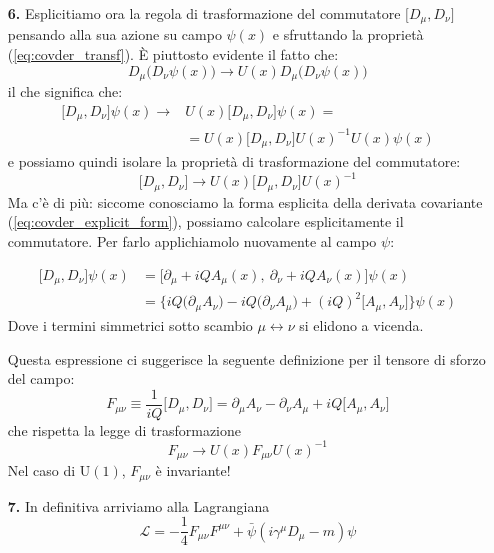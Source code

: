 \documentclass[../main.tex]{subfiles}
\begin{document}
\begin{enumerate}
    \item[\textbf{6.}] Esplicitiamo ora la regola di trasformazione del commutatore $\big[D_\mu,D_\nu\big]$ pensando alla sua azione su campo $\psi(x)$ e sfruttando la proprietà (\ref{eq:covder_transf}). È piuttosto evidente il fatto che:
    \[
    D_\mu\big(D_\nu\psi(x)\big) \rightarrow U(x)D_\mu\big(D_\nu\psi(x)\big)
    \]
    il che significa che:
    \begin{align*}
        \big[D_\mu,D_\nu\big]\psi(x) \rightarrow &U(x)\big[D_\mu,D_\nu\big]\psi(x) = \\
        &= U(x)\big[D_\mu,D_\nu\big]U(x)^{-1}U(x)\psi(x)
    \end{align*}
    e possiamo quindi isolare la proprietà di trasformazione del commutatore:
    \begin{equation}
        \boxed{\big[D_\mu,D_\nu\big] \rightarrow U(x)\big[D_\mu,D_\nu\big]U(x)^{-1}}
        \label{eq:covder_commutator_transf}
    \end{equation}
    Ma c'è di più: siccome conosciamo la forma esplicita della derivata covariante (\ref{eq:covder_explicit_form}), possiamo calcolare esplicitamente il commutatore. Per farlo applichiamolo nuovamente al campo $\psi$:

    \begin{align*}
        \big[D_\mu,D_\nu\big]\psi(x) &= \big[\partial_\mu + iQA_\mu(x), ~\partial_\nu + iQA_\nu(x)\big]\psi(x) \\
        &=\Big\{ iQ\big(\partial_\mu A_\nu\big) -iQ\big(\partial_\nu A_\mu\big) + (iQ)^2\big[A_\mu, A_\nu\big] \Big\}\psi(x)
    \end{align*}
    Dove i termini simmetrici sotto scambio $\mu\leftrightarrow\nu$ si elidono a vicenda.

    Questa espressione ci suggerisce la seguente definizione per il tensore di sforzo del campo:
    \begin{equation}
        \boxed{F_{\mu\nu}\equiv \frac{1}{iQ}\big[D_\mu,D_\nu\big] = \partial_\mu A_\nu - \partial_\nu A_\mu + iQ\big[A_\mu, A_\nu\big]}
        \label{eq:field_strenght_tensor}
    \end{equation}
    che rispetta la legge di trasformazione
    \begin{equation}
        \boxed{F_{\mu\nu}\rightarrow U(x)F_{\mu\nu}U(x)^{-1}}
        \label{eq:field_strenght_tensor_transform}
    \end{equation}
    Nel caso di $\textrm{U}(1)$, $F_{\mu\nu}$ è invariante!
    
    \item[\textbf{7.}] In definitiva arriviamo alla Lagrangiana 
    \begin{equation}
        \boxed{\mathscr{L} = -\frac{1}{4}F_{\mu\nu}F^{\mu\nu} + \bar\psi(i\gamma^\mu D_\mu - m)\psi}
        \label{eq:final_lagrangian_abelian}
    \end{equation}
\end{enumerate}
\end{document}
